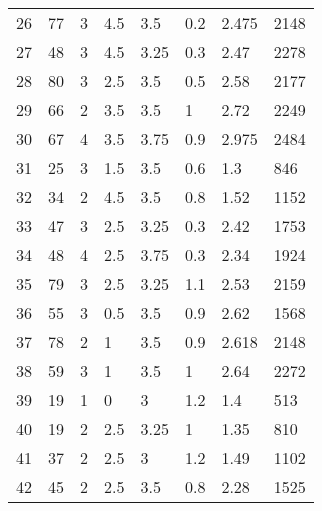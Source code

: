 \begin{table*}[h!]
\begin{tabular*}{\linewidth}{p{40pt}<{\centering}p{30pt}<{\centering}
p{30pt}<{\centering}p{40pt}<{\centering}p{50pt}<{\centering}p{70pt}<{\centering}
p{60pt}<{\centering}p{50pt}<{\centering}}
26 & 77 & 3 & 4.5 & 3.5 & 0.2 & 2.475 & 2148 \\
27 & 48 & 3 & 4.5 & 3.25 & 0.3 & 2.47 & 2278 \\
28 & 80 & 3 & 2.5 & 3.5 & 0.5 & 2.58 & 2177 \\
29 & 66 & 2 & 3.5 & 3.5 & 1 & 2.72 & 2249 \\
30 & 67 & 4 & 3.5 & 3.75 & 0.9 & 2.975 & 2484 \\
31 & 25 & 3 & 1.5 & 3.5 & 0.6 & 1.3 & 846 \\
32 & 34 & 2 & 4.5 & 3.5 & 0.8 & 1.52 & 1152 \\
33 & 47 & 3 & 2.5 & 3.25 & 0.3 & 2.42 & 1753 \\
34 & 48 & 4 & 2.5 & 3.75 & 0.3 & 2.34 & 1924 \\
35 & 79 & 3 & 2.5 & 3.25 & 1.1 & 2.53 & 2159 \\
36 & 55 & 3 & 0.5 & 3.5 & 0.9 & 2.62 & 1568 \\
37 & 78 & 2 & 1 & 3.5 & 0.9 & 2.618 & 2148 \\
38 & 59 & 3 & 1 & 3.5 & 1 & 2.64 & 2272 \\
39 & 19 & 1 & 0 & 3 & 1.2 & 1.4 & 513 \\
40 & 19 & 2 & 2.5 & 3.25 & 1 & 1.35 & 810 \\
41 & 37 & 2 & 2.5 & 3 & 1.2 & 1.49 & 1102 \\
42 & 45 & 2 & 2.5 & 3.5 & 0.8 & 2.28 & 1525 \\
\bottomrule
  \end{tabular*}
  \label{Ap1}
\end{table*}

\newpage

